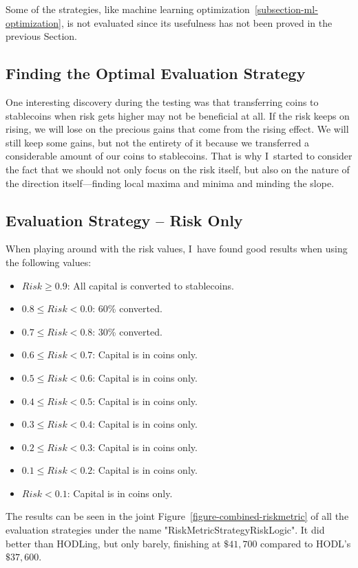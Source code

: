 Some of the strategies, like machine learning optimization~\ref{subsection-ml-optimization}, is not evaluated since its usefulness has not been proved in the previous Section.

\subsection*{Finding the Optimal Evaluation Strategy}
One interesting discovery during the testing was that transferring coins to stablecoins when risk gets higher may not be beneficial at all. If the risk keeps on rising, we will lose on the precious gains that come from the rising effect. We will still keep some gains, but not the entirety of it because we transferred a considerable amount of our coins to stablecoins. That is why I~started to consider the fact that we should not only focus on the risk itself, but also on the nature of the direction itself---finding local maxima and minima and minding the slope.

\subsection*{Evaluation Strategy -- Risk Only}
When playing around with the risk values, I~have found good results when using the following values:
\begin{itemize}
    \item $Risk \ge  0.9$: All capital is converted to stablecoins.
    \item $0.8 \le Risk < 0.0$: 60\% converted.
    \item $0.7 \le Risk < 0.8$: 30\% converted.
    \item $0.6 \le Risk < 0.7$: Capital is in coins only.
    \item $0.5 \le Risk < 0.6$: Capital is in coins only.
    \item $0.4 \le Risk < 0.5$: Capital is in coins only.
    \item $0.3 \le Risk < 0.4$: Capital is in coins only.
    \item $0.2 \le Risk < 0.3$: Capital is in coins only.
    \item $0.1 \le Risk < 0.2$: Capital is in coins only.
    \item $Risk < 0.1$: Capital is in coins only.
\end{itemize}

The results can be seen in the joint Figure~\ref{figure-combined-riskmetric} of all the evaluation strategies under the name "RiskMetricStrategyRiskLogic". It did better than HODLing, but only barely, finishing at $\$41,700$ compared to HODL's $\$37,600$.

